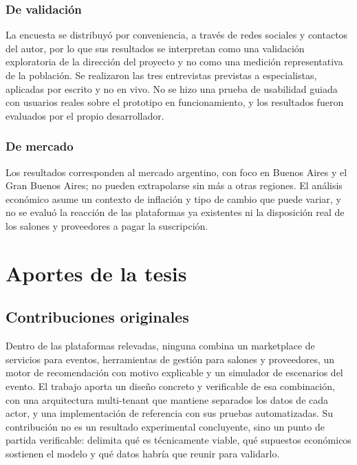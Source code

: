 \subsubsection{De validación}

La encuesta se distribuyó por conveniencia, a través de redes sociales y
contactos del autor, por lo que sus resultados se interpretan como una
validación exploratoria de la dirección del proyecto y no como una
medición representativa de la población. Se realizaron las tres
entrevistas previstas a especialistas, aplicadas por escrito y no en
vivo. No se hizo una prueba de usabilidad guiada con usuarios
reales sobre el prototipo en funcionamiento, y los resultados fueron
evaluados por el propio desarrollador.

\subsubsection{De mercado}

Los resultados corresponden al mercado argentino, con foco en Buenos
Aires y el Gran Buenos Aires; no pueden extrapolarse sin más a otras
regiones. El análisis económico asume un contexto de inflación y tipo de
cambio que puede variar, y no se evaluó la reacción de las plataformas ya
existentes ni la disposición real de los salones y proveedores a pagar
la suscripción.

\section{Aportes de la tesis}

\subsection{Contribuciones originales}

Dentro de las plataformas relevadas, ninguna combina un marketplace de
servicios para eventos, herramientas de gestión para salones y
proveedores, un motor de recomendación con motivo explicable y un
simulador de escenarios del evento. El trabajo aporta un diseño concreto
y verificable de esa combinación, con una arquitectura multi-tenant que
mantiene separados los datos de cada actor, y una implementación de
referencia con sus pruebas automatizadas. Su contribución no es un
resultado experimental concluyente, sino un punto de partida verificable:
delimita qué es técnicamente viable, qué supuestos económicos sostienen el
modelo y qué datos habría que reunir para validarlo.

